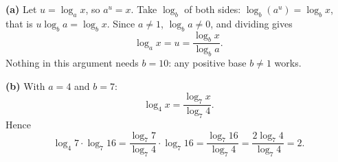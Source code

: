 \textbf{(a)} Let $u=\log_a x$, so $a^u=x$. Take $\log_b$ of both sides: $\log_b(a^u)=\log_b x$, that is $u\log_b a=\log_b x$. Since $a\ne1$, $\log_b a\ne0$, and dividing gives
\[
\log_a x=u=\dfrac{\log_b x}{\log_b a}.
\]
Nothing in this argument needs $b=10$: any positive base $b\ne1$ works.

\textbf{(b)} With $a=4$ and $b=7$:
\[
\log_4 x=\dfrac{\log_7 x}{\log_7 4}.
\]
Hence
\[
\log_4 7\cdot\log_7 16=\dfrac{\log_7 7}{\log_7 4}\cdot\log_7 16=\dfrac{\log_7 16}{\log_7 4}=\dfrac{2\log_7 4}{\log_7 4}=\boxed{2}.
\]
